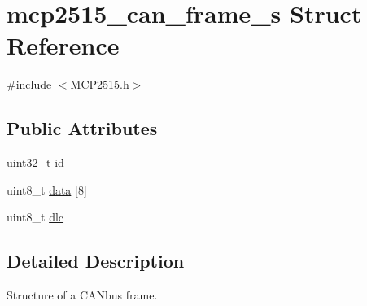 \hypertarget{structmcp2515__can__frame__s}{\section{mcp2515\-\_\-can\-\_\-frame\-\_\-s Struct Reference}
\label{structmcp2515__can__frame__s}
}


{\ttfamily \#include $<$M\-C\-P2515.\-h$>$}

\subsection*{Public Attributes}
\begin{DoxyCompactItemize}
\item 
uint32\-\_\-t \hyperlink{structmcp2515__can__frame__s_acd4002e0542e51d853b9012578f0216b}{id}
\item 
uint8\-\_\-t \hyperlink{structmcp2515__can__frame__s_a438135061fca0fdd743952c80879929f}{data} \mbox{[}8\mbox{]}
\item 
uint8\-\_\-t \hyperlink{structmcp2515__can__frame__s_abee712aaf50a42a28958457427e91831}{dlc}
\end{DoxyCompactItemize}


\subsection{Detailed Description}
Structure of a C\-A\-Nbus frame. 

